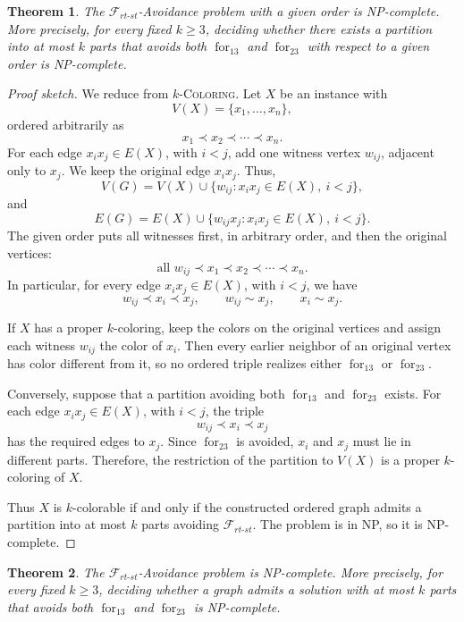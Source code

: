 \documentclass[12pt]{article}
\theoremstyle{plain}
\newtheorem{theorem}{Theorem}[section]
\theoremstyle{definition}
\theoremstyle{remark}
\theoremstyle{definition}
\newcommand{\forlabel}{\mathrm{for}}
\DeclareRobustCommand{\forparam}[1]{%
  \ensuremath{\mathop{\forlabel}\nolimits_{#1}}%
}
\newcommand{\forrt}{\forparam{13}}
\newcommand{\forst}{\forparam{23}}
\begin{document}
\begin{theorem}\label{thm:forrt-st-given-order-np-complete}
The \(\mathcal F_{rt\text{-}st}\)-Avoidance problem with a given order is NP-complete.
More precisely, for every fixed \(k\ge 3\), deciding whether there exists a partition into at most \(k\) parts
that avoids both \(\forrt\) and \(\forst\) with respect to a given order is NP-complete.
\end{theorem}

\begin{proof}[Proof sketch]
We reduce from \(k\)-\textsc{Coloring}. Let \(X\) be an instance with
\[
V(X)=\{x_1,\dots,x_n\},
\]
ordered arbitrarily as
\[
x_1\prec x_2\prec\cdots\prec x_n.
\]
For each edge \(x_i x_j\in E(X)\), with \(i<j\), add one witness vertex \(w_{ij}\), adjacent only to \(x_j\).
We keep the original edge \(x_i x_j\). Thus,
\[
V(G)=V(X)\cup \{w_{ij}:x_i x_j\in E(X),\ i<j\},
\]
and
\[
E(G)=E(X)\cup \{w_{ij}x_j:x_i x_j\in E(X),\ i<j\}.
\]
The given order puts all witnesses first, in arbitrary order, and then the original vertices:
\[
\text{all } w_{ij}\prec x_1\prec x_2\prec\cdots\prec x_n.
\]
In particular, for every edge \(x_i x_j\in E(X)\), with \(i<j\), we have
\[
w_{ij}\prec x_i\prec x_j,
\qquad
w_{ij}\sim x_j,
\qquad
x_i\sim x_j.
\]

If \(X\) has a proper \(k\)-coloring, keep the colors on the original vertices and assign each witness
\(w_{ij}\) the color of \(x_i\). Then every earlier neighbor of an original vertex has color different from it,
so no ordered triple realizes either \(\forrt\) or \(\forst\).

Conversely, suppose that a partition avoiding both \(\forrt\) and \(\forst\) exists. For each edge
\(x_i x_j\in E(X)\), with \(i<j\), the triple
\[
w_{ij}\prec x_i\prec x_j
\]
has the required edges to \(x_j\). Since \(\forst\) is avoided, \(x_i\) and \(x_j\) must lie in different parts.
Therefore, the restriction of the partition to \(V(X)\) is a proper \(k\)-coloring of \(X\).

Thus \(X\) is \(k\)-colorable if and only if the constructed ordered graph admits a partition into at most \(k\)
parts avoiding \(\mathcal F_{rt\text{-}st}\). The problem is in NP, so it is NP-complete.
\end{proof}







\medskip


\begin{theorem}\label{thm:forrt-st-general-np-complete}
The \(\mathcal F_{rt\text{-}st}\)-Avoidance problem is NP-complete.
More precisely, for every fixed \(k\ge 3\), deciding whether a graph admits a solution with at most \(k\) parts
that avoids both \(\forrt\) and \(\forst\) is NP-complete.
\end{theorem}
\end{document}
